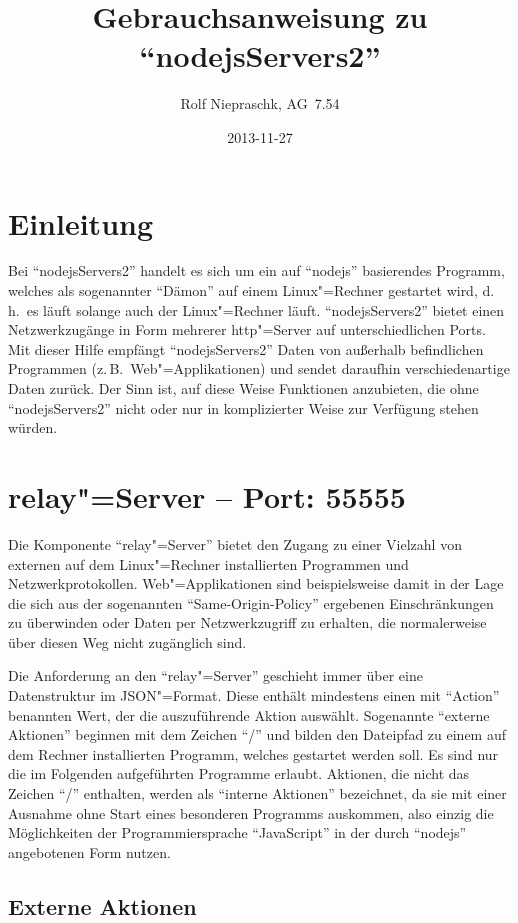 \documentclass[%
fontsize=11pt
,paper=a4
,twoside
,headings=normal
,pagesize
]{scrartcl}
\title{Gebrauchsanweisung zu "`nodejsServers2"'}
\date{2013-11-27}
\author{Rolf Niepraschk, AG~7.54}
\begin{document}
\maketitle

\section*{Einleitung}

Bei "`nodejsServers2"' handelt es sich um ein auf "`nodejs"' basierendes
Programm, welches als sogenannter "`Dämon"' auf einem Linux"=Rechner
gestartet wird, d.\,h.\ es läuft solange auch der Linux"=Rechner läuft.
"`nodejsServers2"' bietet einen Netzwerkzugänge in Form mehrerer
http"=Server auf unterschiedlichen Ports. Mit dieser Hilfe empfängt
"`nodejsServers2"' Daten von außerhalb befindlichen Programmen (z.\,B.\
Web"=Applikationen) und sendet daraufhin verschiedenartige Daten zurück. Der
Sinn ist, auf diese Weise Funktionen anzubieten, die ohne "`nodejsServers2"'
nicht oder nur in komplizierter Weise zur Verfügung stehen würden.

\section*{relay"=Server -- Port: 55555}

Die Komponente "`relay"=Server"' bietet den Zugang zu einer Vielzahl von
externen auf dem Linux"=Rechner installierten Programmen und
Netzwerkprotokollen. Web"=Applikationen sind beispielsweise damit in der Lage
die sich aus der sogenannten "`Same-Origin-Policy"' ergebenen
Einschränkungen zu überwinden oder Daten per Netzwerkzugriff zu erhalten,
die normalerweise über diesen Weg nicht zugänglich sind.

Die Anforderung an den "`relay"=Server"' geschieht immer über eine
Datenstruktur im JSON"=Format. Diese enthält mindestens einen mit "`Action"'
benannten Wert, der die auszuführende Aktion auswählt. Sogenannte "`externe
Aktionen"' beginnen mit dem Zeichen "`/"' und bilden den Dateipfad zu einem
auf dem Rechner installierten Programm, welches gestartet werden soll.
Es sind nur die im Folgenden aufgeführten Programme erlaubt. Aktionen, die
nicht das Zeichen "`/"' enthalten, werden als "`interne Aktionen"'
bezeichnet, da sie mit einer Ausnahme ohne Start eines besonderen Programms
auskommen, also einzig die Möglichkeiten der Programmiersprache
"`JavaScript"' in der durch "`nodejs"' angebotenen Form nutzen.

\subsection*{Externe Aktionen}
\end{document}

